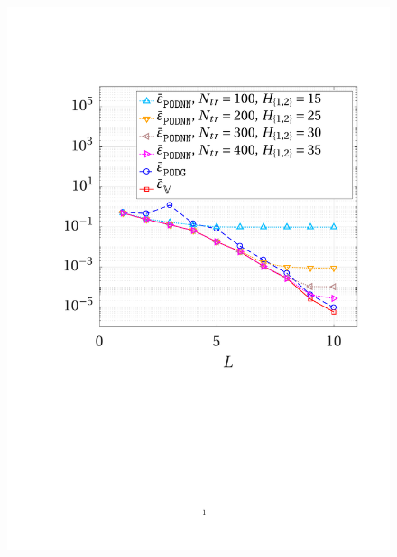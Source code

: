 \documentclass[longtitle]{elsarticle}
\numberwithin{equation}{section}
\theoremstyle{theorem}
\theoremstyle{definition}
\theoremstyle{remark}
\theoremstyle{proposition}
\numberwithin{figure}{section}
\begin{document}
		\begin{figure}[b!]
			\center
			\includegraphics[scale = 0.385, trim = {1cm 9.5cm 1cm 3.5cm}, clip]{poisson1d_3_error_vs_rank}

\end{figure}
\end{document}
